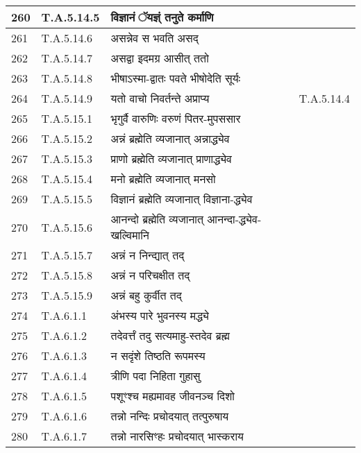 \documentclass[17pt]{extarticle}
\begin{document}
\begin{longtable}{||p{0.4in}||p{0.9in}||p{4.0in}||p{0.9in}||}
        \hline
            260 & T.A.5.14.5 & विज्ञानं ॅयज्ञ्ं तनुते कर्माणि &      \\
        \hline
            261 & T.A.5.14.6 & असन्नेव स भवति असद् &      \\
        \hline
            262 & T.A.5.14.7 & असद्वा इदमग्र आसीत् ततो &      \\
        \hline
            263 & T.A.5.14.8 & भीषाऽस्मा{-}द्वातः पवते भीषोदेति सूर्यः &      \\
        \hline
            264 & T.A.5.14.9 & यतो वाचो निवर्तन्ते अप्राप्य & T.A.5.14.4        \\
        \hline
            265 & T.A.5.15.1 & भृगुर्वै वारुणिः वरुणं पितर{-}मुपससार &      \\
        \hline
            266 & T.A.5.15.2 & अन्नं ब्रह्मेति व्यजानात् अन्नाद्ध्येव &      \\
        \hline
            267 & T.A.5.15.3 & प्राणो ब्रह्मेति व्यजानात् प्राणाद्ध्येव &      \\
        \hline
            268 & T.A.5.15.4 & मनो ब्रह्मेति व्यजानात् मनसो &      \\
        \hline
            269 & T.A.5.15.5 & विज्ञानं ब्रह्मेति व्यजानात् विज्ञाना{-}द्ध्येव &      \\
        \hline
            270 & T.A.5.15.6 & आनन्दो ब्रह्मेति व्यजानात् आनन्दा{-}द्ध्येव{-}खल्विमानि &      \\
        \hline
            271 & T.A.5.15.7 & अन्नं न निन्द्यात् तद् &      \\
        \hline
            272 & T.A.5.15.8 & अन्नं न परिचक्षीत तद् &      \\
        \hline
            273 & T.A.5.15.9 & अन्नं बहु कुर्वीत तद् &      \\
        \hline
            274 & T.A.6.1.1 & अंभस्य पारे भुवनस्य मद्ध्ये &      \\
        \hline
            275 & T.A.6.1.2 & तदेवर्त्तं तदु सत्यमाहु{-}स्तदेव ब्रह्म &      \\
        \hline
            276 & T.A.6.1.3 & न सदृंशे तिष्ठति रूपमस्य &      \\
        \hline
            277 & T.A.6.1.4 & त्रीणि पदा निहिता गुहासु &      \\
        \hline
            278 & T.A.6.1.5 & पशूꣳश्च मह्यमावह जीवनञ्च दिशो &      \\
        \hline
            279 & T.A.6.1.6 & तन्नो नन्दिः प्रचोदयात् तत्पुरुषाय &      \\
        \hline
            280 & T.A.6.1.7 & तन्नो नारसिꣳहः प्रचोदयात् भास्कराय &      \\

\end{longtable}
\end{document}
